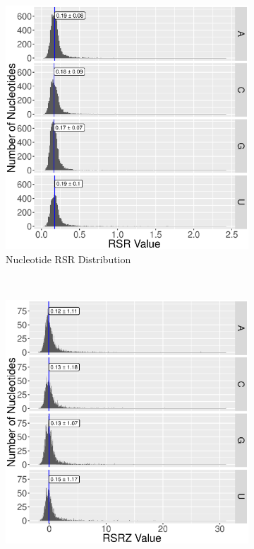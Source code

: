 \begin{figure}[ht]
  \begin{subfigure}[b]{0.49\textwidth}
    \includegraphics[width=\textwidth]{chapter-5/figs/rsr-distribution-by-seq}
    \caption{Nucleotide RSR Distribution}
\label{fig:rsr-nt-distribution}
  \end{subfigure}
  ~
  \begin{subfigure}[b]{0.49\textwidth}
    \includegraphics[width=\textwidth]{chapter-5/figs/rsrz-distribution-by-seq}

\end{subfigure}
\end{figure}
